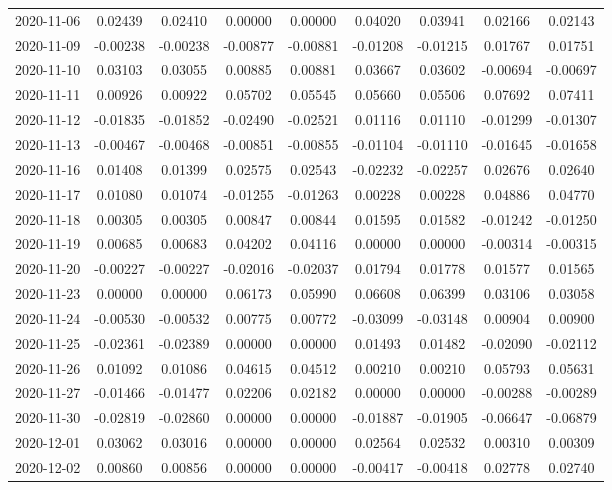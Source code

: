 \begin{footnotesize}
\begin{longtable}{lcccccccc}
2020-11-06 & 0.02439 & 0.02410 & 0.00000 & 0.00000 & 0.04020 & 0.03941 & 0.02166 & 0.02143 \\
2020-11-09 & -0.00238 & -0.00238 & -0.00877 & -0.00881 & -0.01208 & -0.01215 & 0.01767 & 0.01751 \\
2020-11-10 & 0.03103 & 0.03055 & 0.00885 & 0.00881 & 0.03667 & 0.03602 & -0.00694 & -0.00697 \\
2020-11-11 & 0.00926 & 0.00922 & 0.05702 & 0.05545 & 0.05660 & 0.05506 & 0.07692 & 0.07411 \\
2020-11-12 & -0.01835 & -0.01852 & -0.02490 & -0.02521 & 0.01116 & 0.01110 & -0.01299 & -0.01307 \\
2020-11-13 & -0.00467 & -0.00468 & -0.00851 & -0.00855 & -0.01104 & -0.01110 & -0.01645 & -0.01658 \\
2020-11-16 & 0.01408 & 0.01399 & 0.02575 & 0.02543 & -0.02232 & -0.02257 & 0.02676 & 0.02640 \\
2020-11-17 & 0.01080 & 0.01074 & -0.01255 & -0.01263 & 0.00228 & 0.00228 & 0.04886 & 0.04770 \\
2020-11-18 & 0.00305 & 0.00305 & 0.00847 & 0.00844 & 0.01595 & 0.01582 & -0.01242 & -0.01250 \\
2020-11-19 & 0.00685 & 0.00683 & 0.04202 & 0.04116 & 0.00000 & 0.00000 & -0.00314 & -0.00315 \\
2020-11-20 & -0.00227 & -0.00227 & -0.02016 & -0.02037 & 0.01794 & 0.01778 & 0.01577 & 0.01565 \\
2020-11-23 & 0.00000 & 0.00000 & 0.06173 & 0.05990 & 0.06608 & 0.06399 & 0.03106 & 0.03058 \\
2020-11-24 & -0.00530 & -0.00532 & 0.00775 & 0.00772 & -0.03099 & -0.03148 & 0.00904 & 0.00900 \\
2020-11-25 & -0.02361 & -0.02389 & 0.00000 & 0.00000 & 0.01493 & 0.01482 & -0.02090 & -0.02112 \\
2020-11-26 & 0.01092 & 0.01086 & 0.04615 & 0.04512 & 0.00210 & 0.00210 & 0.05793 & 0.05631 \\
2020-11-27 & -0.01466 & -0.01477 & 0.02206 & 0.02182 & 0.00000 & 0.00000 & -0.00288 & -0.00289 \\
2020-11-30 & -0.02819 & -0.02860 & 0.00000 & 0.00000 & -0.01887 & -0.01905 & -0.06647 & -0.06879 \\
2020-12-01 & 0.03062 & 0.03016 & 0.00000 & 0.00000 & 0.02564 & 0.02532 & 0.00310 & 0.00309 \\
2020-12-02 & 0.00860 & 0.00856 & 0.00000 & 0.00000 & -0.00417 & -0.00418 & 0.02778 & 0.02740 \\

\end{longtable}
\end{footnotesize}
